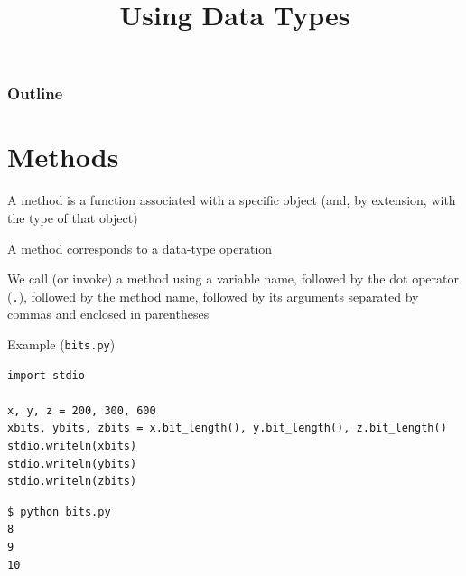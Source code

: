 \documentclass[8pt,a4paper,compress]{beamer}
\title{Using Data Types}
\date{}
\begin{document}
\begin{frame}
\vfill
\titlepage
\end{frame}

\begin{frame}
\frametitle{Outline}
\tableofcontents
\end{frame}

\section{Methods}
\begin{frame}[fragile]
\pause

A method is a function associated with a specific object (and, by extension, with the type of that object)

\pause
\bigskip

A method corresponds to a data-type operation

\pause
\bigskip

We call (or invoke) a method using a variable name, followed by the dot operator (\lstinline{.}), followed by the method name, followed by its arguments separated by commas and enclosed in parentheses

\pause
\bigskip

Example (\lstinline{bits.py})
\begin{lstlisting}[language={}]
import stdio

x, y, z = 200, 300, 600
xbits, ybits, zbits = x.bit_length(), y.bit_length(), z.bit_length()
stdio.writeln(xbits)
stdio.writeln(ybits)
stdio.writeln(zbits)
\end{lstlisting}

\pause

\begin{lstlisting}[language={}]
$ python bits.py
8
9
10
\end{lstlisting}
\end{frame}
\end{document}
